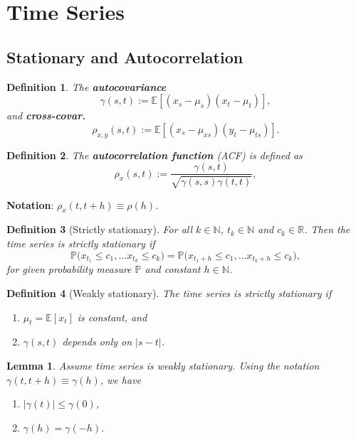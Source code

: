 \documentclass[10pt]{article}
\theoremstyle{remark}
\theoremstyle{plain}
\newtheorem{Lemma}{Lemma}[section]
\newtheorem{Definition}{Definition}[section]
\newcommand{\R}{\mathbb{R}}
\newcommand{\N}{\mathbb{N}}
\numberwithin{equation}{section}
\renewcommand{\leq}{\leqslant}
\begin{document}
%
%
\clearpage
\section{Time Series}

\subsection{Stationary and Autocorrelation}

\begin{Definition}
	The \textbf{autocovariance} $$\gamma (s,t) := \mathds{E} \left[(x_s - \mu_s) (x_t-\mu_t)\right],$$ and \textbf{cross-covar.} $$\rho_{x,y}(s,t):= \mathds{E}\left[(x_s - \mu_{xs})(y_t - \mu_{ts})\right].$$
\end{Definition}

\begin{Definition}
	The \textbf{autocorrelation function} (ACF) is defined as
	\[
	\rho_{x} (s,t)  := \frac{\gamma(s,t)}{\sqrt{\gamma(s,s)\gamma(t,t)}},
	\]
\end{Definition}

\textbf{Notation}: $\rho_{x}(t, t+h)  \equiv \rho(h)$.

\begin{Definition}[Strictly stationary]
	For all $k \in \N$, $t_k \in \N$ and $c_k \in \R$. Then the time series is strictly stationary if
	\[
	\mathds{P} \big(x_{t_1} \leq c_1, \dots x_{t_k} \leq c_k \big) = \mathds{P} \big(x_{t_1+h} \leq c_1, \dots x_{t_k+h} \leq c_k \big),
	\]
	for given probability measure $\mathds{P}$ and constant $h \in \N$.
\end{Definition}
\clearpage

\begin{Definition}[Weakly stationary]
	The time series is strictly stationary if
	\begin{enumerate}
		\item $\mu_t = \mathds{E}[x_t]$ is constant, and
		
		\item $\gamma(s,t)$ depends only on $|s-t|$. 
	\end{enumerate}
\end{Definition}


\begin{Lemma}
	Assume time series is weakly stationary. Using the notation $\gamma (t, t+h) \equiv \gamma (h)$, we have
	\begin{enumerate}
		\item $|\gamma (t)| \leq \gamma(0)$,
		
		\item $\gamma(h) = \gamma(-h)$.
	\end{enumerate}
\end{Lemma}
\end{document}
